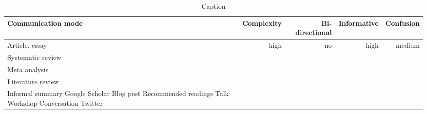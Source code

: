 \begin{table*}\centering
{}
\begin{tabular}{@{}lrrrr@{}}\toprule
Communication mode & Complexity & Bi-directional & Informative  & Confusion
\\\midrule
Article, essay & high & no & high & medium  \\
Systematic review \\
Meta analysis \\
Literature review \\
Informal summary
Google Scholar
Blog post
Recommended readings
Talk
Workshop
Conversation
Twitter


\bottomrule
\end{tabular}
\caption{Caption}
\end{table*}